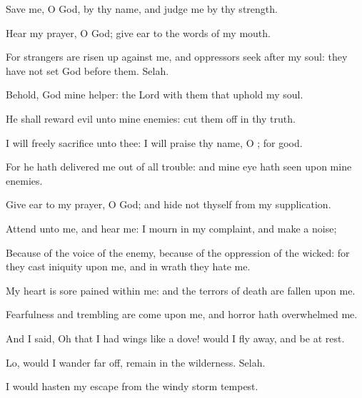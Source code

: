{\Q {}Save me, O
God, by thy
name, and
judge me by thy
strength.


\par }{\Q {}Hear my
prayer, O
God; give
ear to the
words of my
mouth.


\par }{\Q {}For
strangers are risen
up against me, and
oppressors
seek after my
soul: they have not
set
God before them.
Selah.


\par }{\BB \par }
{\Q {}Behold,
God
{} mine
helper: the
Lord
{} with them that
uphold my
soul.


\par }{\Q {}He shall
reward
evil unto mine
enemies: cut them
off in thy
truth.


\par }{\Q {}I will
freely
sacrifice unto thee: I will
praise thy
name, O
{}; for
{}
good.


\par }{\Q {}For he hath
delivered me out of all
trouble: and mine
eye hath
seen
{} upon mine
enemies.




\par }
{\Q {}Give
ear to my
prayer, O
God; and
hide not thyself from my
supplication.


\par }{\Q {}Attend unto me, and
hear me: I
mourn in my
complaint, and make a
noise;


\par }{\Q {}Because of the
voice of the
enemy,
because of the
oppression of the
wicked: for they
cast
iniquity upon me, and in
wrath they
hate me.


\par }{\Q {}My
heart is sore
pained
within me: and the
terrors of
death are
fallen upon me.


\par }{\Q {}Fearfulness and
trembling are
come upon me, and
horror hath
overwhelmed me.


\par }{\Q {}And I
said, Oh
that I had
wings like a
dove!
{} would I fly
away, and be at
rest.


\par }{\Q {}Lo,
{} would I
wander far
off,
{}
remain in the
wilderness.
Selah.


\par }{\Q {}I would
hasten my
escape from the
windy
storm
{}
tempest.


\par }{\BB \par }
